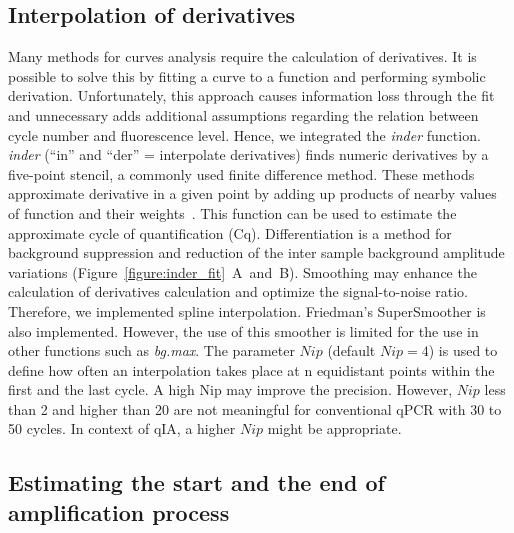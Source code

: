 \documentclass[twocolumn]{bmcart}%
\begin{document}
\subsection*{Interpolation of derivatives}
 
  Many methods for curves analysis require the calculation of derivatives. It 
is 
possible to solve this by fitting a curve to a function and performing symbolic 
derivation. Unfortunately, this approach causes information loss through the 
fit 
and unnecessary adds additional assumptions regarding the relation between 
cycle number and fluorescence level. Hence, we integrated the \textsl{inder} 
function. \textsl{inder} (``in'' and ``der'' = interpolate derivatives) finds 
numeric derivatives by a five-point stencil, a commonly used finite difference 
method. These methods approximate derivative in a given point by adding up 
products of nearby values of function and their weights~\cite{Dahlquist_2008}. 
This function can be used to estimate the approximate cycle of quantification 
(Cq). Differentiation is a method for background suppression and reduction of 
the inter sample background amplitude variations 
(Figure~\ref{figure:inder_fit}~A~and~B). Smoothing may enhance the calculation 
of derivatives calculation and optimize the signal-to-noise ratio. Therefore, 
we 
implemented spline interpolation. Friedman's SuperSmoother is also implemented. 
However, the use of this smoother is limited for the use in other functions 
such 
as \textsl{bg.max}. The parameter $Nip$ (default $Nip = 4$) is used to define 
how often an interpolation takes place at n equidistant points within the first 
and the last cycle. A high Nip may improve the precision. However, $Nip$ less 
than 2 and higher than 20 are not meaningful for conventional qPCR with 30 to 
50 
cycles. In context of qIA, a higher $Nip$ might be appropriate.

\subsection*{Estimating the start and the end of amplification process}
\end{document}
